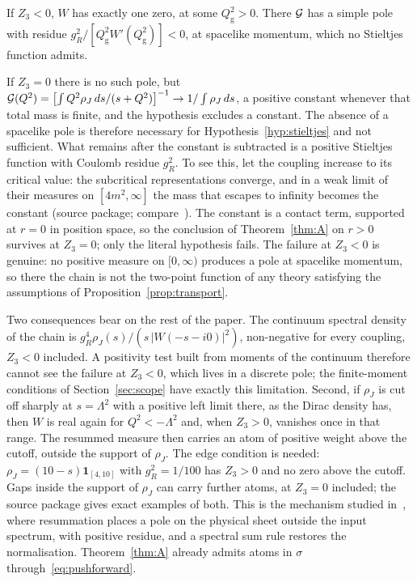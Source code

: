 If $Z_3<0$, $W$ has exactly one zero, at some $Q^2_{\mathrm g}>0$. There $\mathcal{G}$
has a simple pole with residue $g_R^2/[Q^2_{\mathrm g}W'(Q^2_{\mathrm g})]<0$, at
spacelike momentum, which no Stieltjes function admits.

If $Z_3=0$ there is no such pole, but
$\mathcal{G}(Q^2)=\bigl[\int Q^2\rho_J\,ds/(s+Q^2)\bigr]^{-1}\to1/\int\rho_J\,ds$,
a positive constant whenever that total mass is finite, and the hypothesis
excludes a constant. The absence of a spacelike pole is therefore necessary for
Hypothesis~\ref{hyp:stieltjes} and not sufficient. What remains after the
constant is subtracted is a positive Stieltjes function with Coulomb residue
$g_R^2$. To see this, let the coupling increase to its critical value: the
subcritical representations converge, and in a weak limit of their measures
on $[4m^2,\infty]$ the mass that escapes to infinity becomes the constant
(source package; compare~\cite[Thm.~2.2]{schilling_song_vondracek2012}). The
constant is a contact term, supported at $r=0$ in position space, so the
conclusion of Theorem~\ref{thm:A} on $r>0$ survives at $Z_3=0$; only the
literal hypothesis fails. The failure at $Z_3<0$ is genuine: no positive measure on $[0,\infty)$
produces a pole at spacelike momentum, so there the chain is not the
two-point function of any theory satisfying the assumptions of
Proposition~\ref{prop:transport}.

Two consequences bear on the rest of the paper. The continuum spectral density
of the chain is $g_R^4\rho_J(s)/(s\,|W(-s-i0)|^2)$, non-negative for every
coupling, $Z_3<0$ included. A positivity test built from moments of the
continuum therefore cannot see the failure at $Z_3<0$, which lives in a discrete
pole; the finite-moment conditions of Section~\ref{sec:scope} have exactly this
limitation. Second, if $\rho_J$ is cut off sharply at $s=\Lambda^2$ with a
positive left limit there, as the Dirac density has, then $W$ is real again for
$Q^2<-\Lambda^2$ and, when $Z_3>0$, vanishes once in that range. The resummed
measure then carries an atom of positive weight above the cutoff, outside the
support of $\rho_J$. The edge condition is needed:
$\rho_J=(10-s)\mathbf 1_{[4,10]}$ with $g_R^2=1/100$ has $Z_3>0$ and no zero
above the cutoff. Gaps inside the support of $\rho_J$ can carry further atoms,
at $Z_3=0$ included; the source package gives exact examples of both. This is
the mechanism studied
in~\cite{giacosa_wolkanowski_2012}, where resummation places a pole on the
physical sheet outside the input spectrum, with positive residue, and a
spectral sum rule restores the normalisation. Theorem~\ref{thm:A} already
admits atoms in $\sigma$ through~\eqref{eq:pushforward}.

